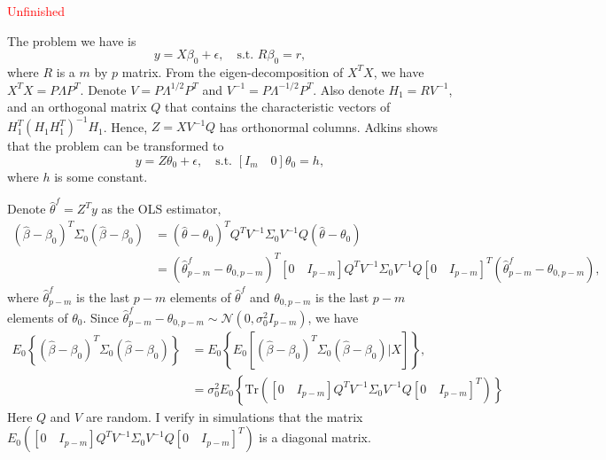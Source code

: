 \textcolor{red}{Unfinished}

The problem we have is 
\begin{equation}
y = X\beta_0 + \epsilon, \quad \text{s.t. } R\beta_0=r,
\end{equation}
where $R$ is a $m$ by $p$ matrix. From the eigen-decomposition of $X^T X$, we have $X^T X = P \Lambda P^T$. Denote $V = P \Lambda^{1/2} P^T$ and $V^{-1} = P \Lambda^{-1/2} P^T$. Also denote $H_1 = R V^{-1}$, and an orthogonal matrix $Q$ that contains the characteristic vectors of $H_1 ^T (H_1 H_1^T)^{-1} H_1$. Hence, $Z = XV^{-1}Q$ has orthonormal columns. Adkins shows that the problem can be transformed to
\begin{equation}
y = Z\theta_0 + \epsilon, \quad \text{s.t. } [I_m \quad 0]\theta_0=h,
\end{equation}
where $h$ is some constant. 

Denote $\hat{\theta}^f = Z^T y$ as the OLS estimator, 
\begin{equation}
\begin{aligned}
( \hat{\beta} - \beta_0 )^T \Sigma_0 ( \hat{\beta} - \beta_0 ) 
&= ( \hat{\theta} - \theta_0 )^T Q^T V^{-1} \Sigma_0 V^{-1} Q ( \hat{\theta} - \theta_0 ) \\
&= ( \hat{\theta}^f_{p-m} - \theta_{0,p-m} )^T [0 \quad I_{p-m}] Q^T V^{-1} \Sigma_0 V^{-1} Q [0 \quad I_{p-m}]^T ( \hat{\theta}^f_{p-m} - \theta_{0,p-m} ),
\end{aligned}
\end{equation}
where $\hat{\theta}^f_{p-m}$ is the last $p-m$ elements of $\hat{\theta}^f$ and $\theta_{0,p-m}$ is the last $p-m$ elements of $\theta_0$. Since $\hat{\theta}^f_{p-m} - \theta_{0,p-m} \sim \mathcal{N}(0, \sigma_0^2 I_{p-m})$, we have
\begin{equation}
\begin{aligned}
E_0 \left\{ ( \hat{\beta} - \beta_0 )^T \Sigma_0 ( \hat{\beta} - \beta_0 )  \right\} 
&= E_0 \left\{ E_0 \left[ ( \hat{\beta} - \beta_0 )^T \Sigma_0 ( \hat{\beta} - \beta_0 ) | X \right]  \right\},\\
&= \sigma_0^2 E_0\left\{ \text{Tr}\left( [0 \quad I_{p-m}] Q^T V^{-1} \Sigma_0 V^{-1} Q [0 \quad I_{p-m}]^T \right) \right\}
\end{aligned}
\end{equation}
Here $Q$ and $V$ are random. I verify in simulations that the matrix $E_0 ([0 \quad I_{p-m}] Q^T V^{-1} \Sigma_0 V^{-1} Q [0 \quad I_{p-m}]^T)$ is a diagonal matrix.
\fi



